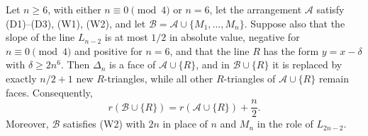 \begin{lemma}\label{lem:r-triangle}
Let $n\ge6$, with either $n\equiv0\pmod4$ or $n=6$, let the arrangement $\mathcal A$ satisfy \textup{(D1)--(D3)}, \textup{(W1)}, \textup{(W2)}, and let $\mathcal B=\mathcal A\cup\{M_1,\ldots,M_n\}$.
Suppose also that the slope of the line $L_{n-2}$ is at most $1/2$ in absolute value, negative for $n\equiv0\pmod4$ and positive for $n=6$, and that the line $R$ has the form $y=x-\delta$ with $\delta\ge2n^6$.
Then $\Delta_n$ is a face of $\mathcal A\cup\{R\}$, and in $\mathcal B\cup\{R\}$ it is replaced by exactly $n/2+1$ new $R$-triangles, while all other $R$-triangles of $\mathcal A\cup\{R\}$ remain faces.
Consequently,
\[
r(\mathcal B\cup\{R\})
=r(\mathcal A\cup\{R\})+\frac n2.
\]
Moreover, $\mathcal B$ satisfies \textup{(W2)} with $2n$ in place of $n$ and $M_n$ in the role of $L_{2n-2}$.
\end{lemma}

